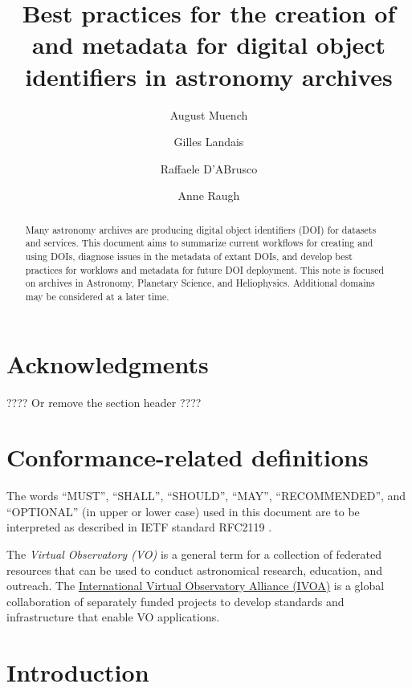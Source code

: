 \documentclass[11pt,a4paper]{ivoa}
\title{Best practices for the creation of and metadata for digital object identifiers in astronomy archives}
\author[https://orcid.org/0000-0003-0666-6367]{August Muench}
\author[]{Gilles Landais}
\author[]{Raffaele D'ABrusco}
\author[]{Anne Raugh}
\begin{document}

\begin{abstract}
Many astronomy archives are producing digital object identifiers (DOI) for datasets and services.
This document aims to summarize current workflows for creating and using DOIs, 
diagnose issues in the metadata of extant DOIs, 
and develop best practices for worklows and metadata for future DOI deployment.
This note is focused on archives in Astronomy, Planetary Science, and Heliophysics. 
Additional domains may be considered at a later time.
\end{abstract}


\section*{Acknowledgments}

???? Or remove the section header ????

\section*{Conformance-related definitions}

The words ``MUST'', ``SHALL'', ``SHOULD'', ``MAY'', ``RECOMMENDED'', and
``OPTIONAL'' (in upper or lower case) used in this document are to be
interpreted as described in IETF standard RFC2119 \citep{std:RFC2119}.

The \emph{Virtual Observatory (VO)} is a general term for a collection of federated resources that can be used to conduct astronomical research, education, and outreach.
The \href{https://www.ivoa.net}{International Virtual Observatory Alliance (IVOA)} is a global collaboration of separately funded projects to develop standards and infrastructure that enable VO applications.


\section{Introduction}
\label{sec:intro}
\end{document}
